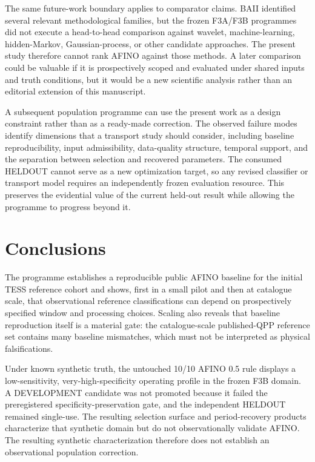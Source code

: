 \documentclass[manuscript,linenumbers]{aastex702}
\begin{document}
The same future-work boundary applies to comparator claims. BAII identified several relevant methodological families, but the frozen F3A/F3B programmes did not execute a head-to-head comparison against wavelet, machine-learning, hidden-Markov, Gaussian-process, or other candidate approaches. The present study therefore cannot rank AFINO against those methods. A later comparison could be valuable if it is prospectively scoped and evaluated under shared inputs and truth conditions, but it would be a new scientific analysis rather than an editorial extension of this manuscript.

A subsequent population programme can use the present work as a design constraint rather than as a ready-made correction. The observed failure modes identify dimensions that a transport study should consider, including baseline reproducibility, input admissibility, data-quality structure, temporal support, and the separation between selection and recovered parameters. The consumed HELDOUT cannot serve as a new optimization target, so any revised classifier or transport model requires an independently frozen evaluation resource. This preserves the evidential value of the current held-out result while allowing the programme to progress beyond it.

\section{Conclusions}
The programme establishes a reproducible public AFINO baseline for the initial TESS reference cohort and shows, first in a small pilot and then at catalogue scale, that observational reference classifications can depend on prospectively specified window and processing choices. Scaling also reveals that baseline reproduction itself is a material gate: the catalogue-scale published-QPP reference set contains many baseline mismatches, which must not be interpreted as physical falsifications.

Under known synthetic truth, the untouched 10/10 AFINO 0.5 rule displays a low-sensitivity, very-high-specificity operating profile in the frozen F3B domain. A DEVELOPMENT candidate was not promoted because it failed the preregistered specificity-preservation gate, and the independent HELDOUT remained single-use. The resulting selection surface and period-recovery products characterize that synthetic domain but do not observationally validate AFINO. The resulting synthetic characterization therefore does not establish an observational population correction.
\end{document}
